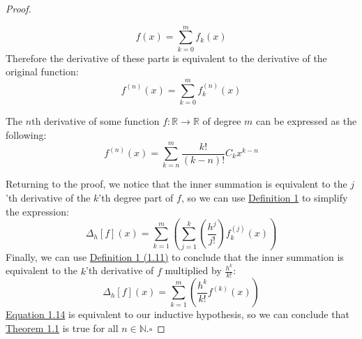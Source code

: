 \begin{proof}
\begin{definition}
\begin{equation}
      \label{eq:ordered-part-definition-2}
      f\left(x\right)=\sum_{k=0}^{m}f_k\left(x\right)
    \end{equation}
    Therefore the derivative of these parts is equivalent to the derivative of the original function:
    \begin{equation}
      \label{eq:ordered-part-definition-3}
      f^{\left(n\right)}\left(x\right)=\sum_{k=0}^{m}f^{\left(n\right)}_k\left(x\right)
    \end{equation}
  \end{definition}
  \begin{definition}
    \label{def:nth-derivative-definition}
    The $n$th derivative of some function $f:\mathbb{R}\to\mathbb{R}$ of degree $m$ can be expressed as the following:
    \begin{equation}
      \label{eq:nth-derivative-definition}
      f^{\left(n\right)}\left(x\right)=\sum_{k=n}^{m}\frac{k!}{\left(k-n\right)!}C_kx^{k-n}
    \end{equation}
  \end{definition}
  Returning to the proof, we notice that the inner summation is equivalent to the $j$'th derivative of the $k$'th degree part of $f$, so we can use \hyperref[def:ordered-part-definition]{Definition 1} to simplify the expression:
  \begin{equation}
    \label{eq:fdo-simplification-8}
    \Delta_{h}\left[f\right]\left(x\right)=\sum_{k=1}^{m}\left(\sum_{j=1}^{k}\left(\frac{h^j}{j!}\right)f^{\left(j\right)}_k\left(x\right)\right)
  \end{equation}
  Finally, we can use \hyperref[eq:ordered-part-definition-3]{Definition 1 (1.11)} to conclude that the inner summation is equivalent to the $k$'th derivative of $f$ multiplied by $\frac{h^k}{k!}$:
  \begin{equation}
    \label{eq:fdo-simplification-9}
    \Delta_{h}\left[f\right]\left(x\right)=\sum_{k=1}^{m}\left(\frac{h^k}{k!}f^{\left(k\right)}\left(x\right)\right)
  \end{equation}
  \hyperref[eq:fdo-simplification-9]{Equation 1.14} is equivalent to our inductive hypothesis, so we can conclude that \hyperref[thm:equality-thm]{Theorem 1.1} is true for all $n\in\mathbb{N}$.\hfill$\square$
\end{proof}